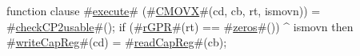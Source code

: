 function clause #\hyperref[zexecute]{execute}# (#\hyperref[zCMOVX]{CMOVX}#(cd, cb, rt, ismovn)) =
{
  #\hyperref[zcheckCP2usable]{checkCP2usable}#();
  if (#\hyperref[zrGPR]{rGPR}#(rt) == #\hyperref[zzzeros]{zeros}#()) ^ ismovn then
    #\hyperref[zwriteCapReg]{writeCapReg}#(cd) = #\hyperref[zreadCapReg]{readCapReg}#(cb);
}
